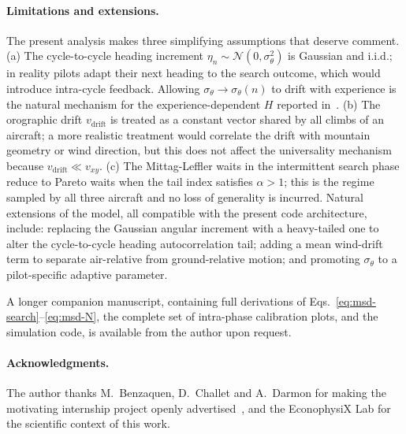 \documentclass[10pt,twocolumn,a4paper]{article}
\begin{document}
\paragraph*{Limitations and extensions.}
The present analysis makes three simplifying assumptions that
deserve comment. (a) The cycle-to-cycle heading increment
$\eta_n\sim\mathcal{N}(0,\sigma_\theta^2)$ is Gaussian and
i.i.d.; in reality pilots adapt their next heading to the search
outcome, which would introduce intra-cycle feedback. Allowing
$\sigma_\theta\to\sigma_\theta(n)$ to drift with experience is the
natural mechanism for the experience-dependent $H$ reported
in~\cite{vilpellet2026}. (b) The orographic drift
$v_{\mathrm{drift}}$ is treated as a constant vector shared by all
climbs of an aircraft; a more realistic treatment would correlate
the drift with mountain geometry or wind direction, but this does
not affect the universality mechanism because
$v_{\mathrm{drift}}\ll v_{xy}$. (c) The Mittag-Leffler waits in
the intermittent search phase reduce to Pareto waits when the
tail index satisfies $\alpha>1$; this is the regime sampled by all
three aircraft and no loss of generality is incurred. Natural
extensions of the model, all compatible with the present code
architecture, include: replacing the Gaussian angular increment
with a heavy-tailed one to alter the cycle-to-cycle heading
autocorrelation tail; adding a mean wind-drift term to separate
air-relative from ground-relative motion; and promoting
$\sigma_\theta$ to a pilot-specific adaptive parameter.

A longer companion manuscript, containing full derivations of
Eqs.~\eqref{eq:msd-search}--\eqref{eq:msd-N}, the complete set of
intra-phase calibration plots, and the simulation code, is
available from the author upon request.

\paragraph*{Acknowledgments.}
The author thanks M.~Benzaquen, D.~Challet and A.~Darmon for
making the motivating internship project openly
advertised~\cite{vilpellet2026}, and the EconophysiX Lab for the
scientific context of this work.

{\footnotesize


}
\end{document}
